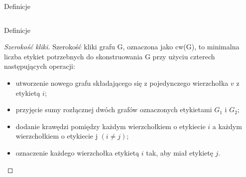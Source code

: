 \documentclass[polish]{beamer}
\begin{document}
\begin{frame}{Definicje}
\begin{examples}
\begin{columns}[t]
              \quad    
        \end{columns}
    \end{examples}
\end{frame}

\begin{frame}{Definicje}
    \begin{proof}[Szerokość kliki]
        \renewcommand{\qedsymbol}{}
        Szerokość kliki grafu G, oznaczona jako cw(G), to minimalna liczba etykiet potrzebnych do skonstruowania G przy użyciu czterech następujących operacji:
        \begin{itemize}
            \item utworzenie nowego grafu składającego się z pojedynczego wierzchołka $v$ z etykietą $i$; 
            \item przyjęcie sumy rozłącznej dwóch grafów oznaczonych etykietami $G_1$ i $G_2$;
            \item dodanie krawędzi pomiędzy każdym wierzchołkiem o etykiecie $i$ a każdym wierzchołkiem o etykiecie j $(i \neq j)$;
            \item oznaczenie każdego wierzchołka etykietą $i$ tak, aby miał etykietę $j$.
        \end{itemize}
    \end{proof}
\end{frame}
\end{document}
